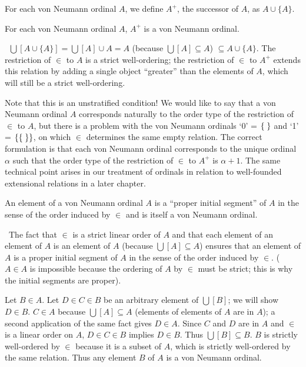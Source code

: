 \begin{definition}
 For each von Neumann ordinal $A$, we define $A^+$, the {\upshape successor} of
 $A$, as $A \cup \{A\}$. 
\end{definition}

\begin{lemme}
 For each von Neumann ordinal $A$, $A^+$ is a von Neumann ordinal.
\end{lemme}

\preuve\ $\bigcup[A \cup \{A\}] = \bigcup[A] \cup A = A$ (because $\bigcup[A]
\subseteq A$) $\subseteq A \cup \{A\}$.  The restriction of $\in$ to $A$ is a
strict well-ordering; the restriction of $\in$ to $A^+$ extends this relation
by adding a single object ``greater'' than the elements of $A$, which will
still be a strict well-ordering.
\finpreuve

Note that this is an unstratified condition!  We
would like to say that a von Neumann ordinal $A$ corresponds naturally
to the order type of the restriction of $\in$ to
$A$, but there is a problem with the von Neumann ordinals `0' = $\mbox{$\{\;\}$}$
and `1' = $\{\mbox{$\{\;\}$}\}$, on which $\in$ determines the same empty
relation.  The correct formulation is that each von Neumann ordinal
corresponds to the unique ordinal $\alpha$ such that the order type of
the restriction of $\in$ to $A^+$ is $\alpha+1$.  The same technical
point arises in our treatment of ordinals in relation to well-founded
extensional relations in a later chapter.

\begin{lemme}
 An element of a von Neumann ordinal $A$ is a ``proper
 initial segment'' of $A$ in the sense of the order
 induced by $\in$ and is itself a von Neumann ordinal.
\end{lemme}

\preuve\ The fact that $\in$ is a strict linear order of $A$ and
that each element of an element of $A$ is an element of $A$ (because
$\bigcup[A] \subseteq A$) ensures that an element of $A$ is a proper
initial segment of $A$ in the sense of the order induced by $\in$.
($A \in A$ is impossible because the ordering of $A$ by $\in$ must be
strict; this is why the initial segments are proper).
 
Let $B \in A$.  Let $D\in C\in B$ be an arbitrary element of
$\bigcup[B]$; we will show $D\in B$.  $C\in A$ because
$\bigcup[A]\subseteq A$ (elements of elements of $A$ are in $A$); a
second application of the same fact gives $D\in A$.  Since $C$ and $D$
are in $A$ and $\in$ is a linear order on $A$, $D\in C\in
B$ implies $D \in B$.  Thus $\bigcup[B] \subseteq B$.  $B$ is strictly
well-ordered by $\in$ because it is a subset of $A$,
which is strictly well-ordered by the same relation.  Thus any element $B$ of
$A$ is a von Neumann ordinal.
\finpreuve

